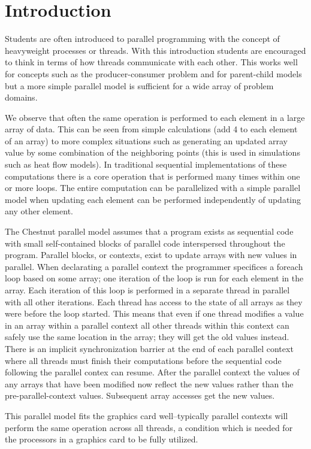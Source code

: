 
\section{Introduction}

Students are often introduced to parallel programming with the concept of
heavyweight processes or threads. With this introduction students are
encouraged to think in terms of how threads communicate with each other. This
works well for concepts such as the producer-consumer problem and for
parent-child models but a more simple parallel model is sufficient for a wide
array of problem domains.

We observe that often the same operation is performed to each element in a
large array of data. This can be seen from simple calculations (add 4 to each
element of an array) to more complex situations such as generating an updated
array value by some combination of the neighboring points (this is used in
simulations such as heat flow models). In traditional sequential
implementations of these computations there is a core operation that is
performed many times within one or more loops. The entire computation can be
parallelized with a simple parallel model when updating each element can be
performed independently of updating any other element.

The Chestnut parallel model assumes that a program exists as sequential code
with small self-contained blocks of parallel code interspersed throughout the
program. Parallel blocks, or contexts, exist to update arrays with new values
in parallel. When declarating a parallel context the programmer specifices a
foreach loop based on some array; one iteration of the loop is run for each
element in the array. Each iteration of this loop is performed in a separate
thread in parallel with all other iterations. Each thread has access to the
state of all arrays as they were before the loop started. This means that even
if one thread modifies a value in an array within a parallel context all other
threads within this context can safely use the same location in the array; they
will get the old values instead. There is an implicit synchronization barrier
at the end of each parallel context where all threads must finish their
computations before the sequential code following the parallel contex can
resume. After the parallel context the values of any arrays that have been
modified now reflect the new values rather than the pre-parallel-context
values. Subsequent array accesses get the new values.

This parallel model fits the graphics card well--typically parallel contexts
will perform the same operation across all threads, a condition which is needed
for the processors in a graphics card to be fully utilized.

